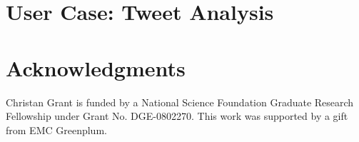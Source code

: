 \documentclass[11pt,letterpaper]{article}
\begin{document}
\section{User Case: Tweet Analysis}
\label{sec:blind}


\section*{Acknowledgments}
Christan Grant is funded by a National
Science Foundation Graduate Research Fellowship under Grant No. DGE-0802270.
This work was supported by a gift from EMC Greenplum.



\end{document}
